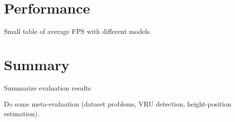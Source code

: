 \section{Performance}
\label{sec:performance}

Small table of average FPS with different models.


\section{Summary}
\label{sec:summary}

Summarize evaluation results

Do some meta-evaluation (dataset problems, VRU detection, height-position estimation).

